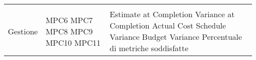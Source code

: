 {\begin{longtable}{C{3cm} C{2cm} C{9.7cm}}
\\
Gestione & MPC6 \newline MPC7 \newline MPC8 \newline MPC9 \newline MPC10 \newline MPC11 & Estimate at Completion \newline  Variance at Completion
\newline Actual Cost \newline Schedule Variance \newline Budget Variance \newline Percentuale di metriche soddisfatte\\


\end{longtable}
}
